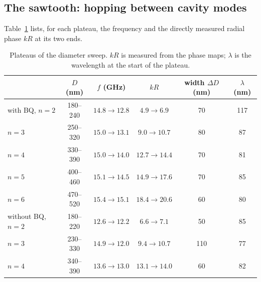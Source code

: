 \documentclass[11pt,a4paper]{article}
\begin{document}
\subsection{The sawtooth: hopping between cavity modes}
Table~\ref{tab:plateaus} lists, for each plateau, the frequency and the directly measured radial phase $kR$ at
its two ends.

\begin{table}[h]
\centering
\caption{Plateaus of the diameter sweep.  $kR$ is measured from the phase maps; $\lambda$ is the wavelength at
the start of the plateau.}
\label{tab:plateaus}
\begin{tabular}{lccccc}
\toprule
 & $D$ (nm) & $f$ (GHz) & $kR$ & width $\Delta D$ (nm) & $\lambda$ (nm)\\
\midrule
with BQ, $n=2$ & 180--240 & $14.8\to12.8$ & $4.9\to6.9$ & 70 & 117\\
\phantom{with BQ, }$n=3$ & 250--320 & $15.0\to13.1$ & $9.0\to10.7$ & 80 & 87\\
\phantom{with BQ, }$n=4$ & 330--390 & $15.0\to14.0$ & $12.7\to14.4$ & 70 & 81\\
\phantom{with BQ, }$n=5$ & 400--460 & $15.1\to14.5$ & $14.9\to17.6$ & 70 & 85\\
\phantom{with BQ, }$n=6$ & 470--520 & $15.4\to15.1$ & $18.4\to20.6$ & 60 & 80\\
\midrule
without BQ, $n=2$ & 180--220 & $12.6\to12.2$ & $6.6\to7.1$ & 50 & 85\\
\phantom{without BQ, }$n=3$ & 230--330 & $14.9\to12.0$ & $9.4\to10.7$ & 110 & 77\\
\phantom{without BQ, }$n=4$ & 340--390 & $13.6\to13.0$ & $13.1\to14.0$ & 60 & 82\\
\bottomrule
\end{tabular}
\end{table}
\end{document}
